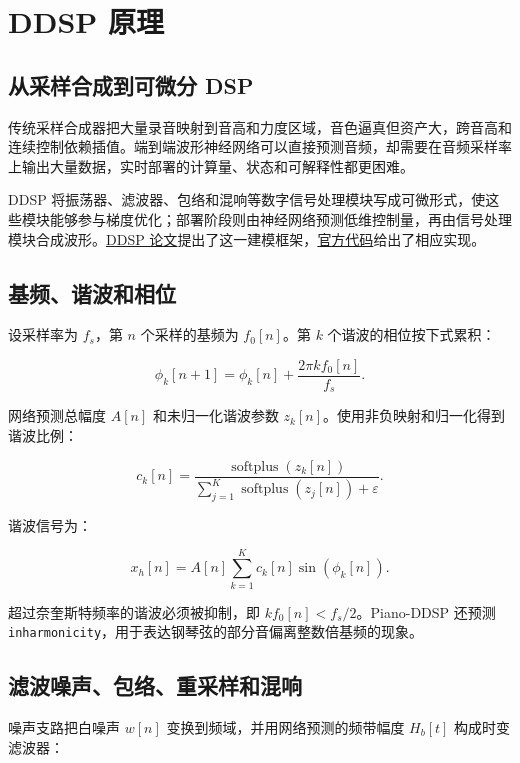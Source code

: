 \section{DDSP 原理}\label{src-experiment-case3-ddsp-theory}

\subsection{从采样合成到可微分
DSP}\label{src-experiment-case3-ddsp-motivation}

传统采样合成器把大量录音映射到音高和力度区域，音色逼真但资产大，跨音高和连续控制依赖插值。端到端波形神经网络可以直接预测音频，却需要在音频采样率上输出大量数据，实时部署的计算量、状态和可解释性都更困难。

DDSP
将振荡器、滤波器、包络和混响等数字信号处理模块写成可微形式，使这些模块能够参与梯度优化；部署阶段则由神经网络预测低维控制量，再由信号处理模块合成波形。\href{https://arxiv.org/abs/2001.04643}{DDSP
论文}提出了这一建模框架，\href{https://github.com/magenta/ddsp}{官方代码}给出了相应实现。

\subsection{基频、谐波和相位}\label{src-experiment-case3-harmonic-synthesis}

设采样率为 \(f_s\)，第 \(n\) 个采样的基频为 \(f_0[n]\)。第 \(k\)
个谐波的相位按下式累积：

\[
\phi_k[n+1] = \phi_k[n] + \frac{2\pi k f_0[n]}{f_s}.
\]

网络预测总幅度 \(A[n]\) 和未归一化谐波参数
\(z_k[n]\)。使用非负映射和归一化得到谐波比例：

\[
c_k[n] = \frac{\operatorname{softplus}(z_k[n])}
{\sum_{j=1}^{K}\operatorname{softplus}(z_j[n]) + \varepsilon}.
\]

谐波信号为：

\[
x_h[n] = A[n]\sum_{k=1}^{K}c_k[n]\sin(\phi_k[n]).
\]

超过奈奎斯特频率的谐波必须被抑制，即 \(k f_0[n] < f_s/2\)。Piano-DDSP
还预测
\passthrough{\lstinline!inharmonicity!}，用于表达钢琴弦的部分音偏离整数倍基频的现象。

\subsection{滤波噪声、包络、重采样和混响}\label{src-experiment-case3-noise-reverb}

噪声支路把白噪声 \(w[n]\) 变换到频域，并用网络预测的频带幅度 \(H_b[t]\)
构成时变滤波器：

